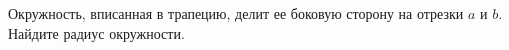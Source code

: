 \begin{ex}
	\begin{condition}
		Окружность, вписанная в трапецию, делит ее боковую сторону на отрезки \( a  \) и \( b \). Найдите радиус окружности.
	\end{condition}
\end{ex}